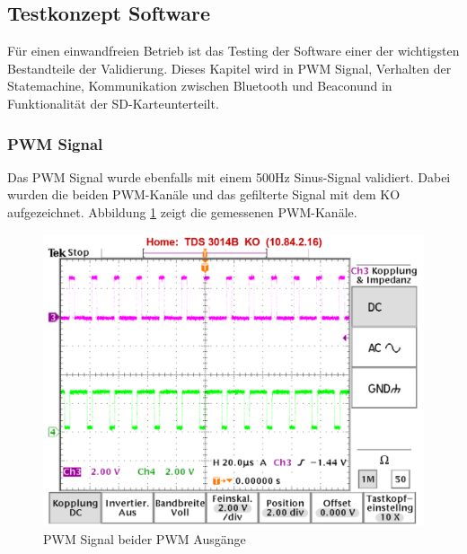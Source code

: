 \subsection{Testkonzept Software}\label{sec:testkonzeptSoftware}

Für einen einwandfreien Betrieb ist das Testing der Software einer der wichtigsten Bestandteile der Validierung. Dieses Kapitel wird in \glqq PWM Signal\grqq, \glqq Verhalten der Statemachine\grqq, \glqq Kommunikation zwischen Bluetooth und Beacon\grqq und in \glqq Funktionalität der SD-Karte\grqq unterteilt.

\subsubsection{PWM Signal}\label{sec: Validierung PWM Signal}

Das PWM Signal wurde ebenfalls mit einem 500Hz Sinus-Signal validiert. Dabei wurden die beiden PWM-Kanäle und das gefilterte Signal mit dem KO aufgezeichnet. Abbildung \ref{fig:Signal PWM Ausgänge} zeigt die gemessenen PWM-Kanäle.

\begin{figure}[H]
	\begin{center}
		\includegraphics[width=120mm]{data/PWM_Signal_500Hz_Mono_mit_Infos.png}
		\caption[PWM Signal beider PWM Ausgänge]{PWM Signal beider PWM Ausgänge} %
		\label{fig:Signal PWM Ausgänge}
	\end{center}
\end{figure}



